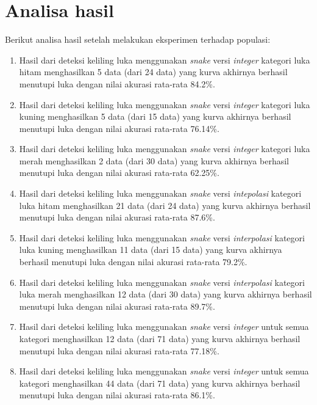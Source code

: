 \section{Analisa hasil}
Berikut analisa hasil setelah melakukan eksperimen terhadap populasi:
\begin{enumerate}
	\item Hasil dari deteksi keliling luka menggunakan \emph{snake} versi \emph{integer} kategori luka hitam menghasilkan 5 data (dari 24 data) yang kurva akhirnya berhasil menutupi luka dengan nilai akurasi rata-rata 84.2\%.
	\item Hasil dari deteksi keliling luka menggunakan \emph{snake} versi \emph{integer} kategori luka kuning menghasilkan 5 data (dari 15 data) yang kurva akhirnya berhasil menutupi luka dengan nilai akurasi rata-rata 76.14\%.
	\item Hasil dari deteksi keliling luka menggunakan \emph{snake} versi \emph{integer} kategori luka merah menghasilkan 2 data (dari 30 data) yang kurva akhirnya berhasil menutupi luka dengan nilai akurasi rata-rata 62.25\%.
	\item Hasil dari deteksi keliling luka menggunakan \emph{snake} versi \emph{intepolasi} kategori luka hitam menghasilkan 21 data (dari 24 data) yang kurva akhirnya berhasil menutupi luka dengan nilai akurasi rata-rata 87.6\%.
	\item Hasil dari deteksi keliling luka menggunakan \emph{snake} versi \emph{interpolasi} kategori luka kuning menghasilkan 11 data (dari 15 data) yang kurva akhirnya berhasil menutupi luka dengan nilai akurasi rata-rata 79.2\%.
	\item Hasil dari deteksi keliling luka menggunakan \emph{snake} versi \emph{interpolasi} kategori luka merah menghasilkan 12 data (dari 30 data) yang kurva akhirnya berhasil menutupi luka dengan nilai akurasi rata-rata 89.7\%.
	\item Hasil dari deteksi keliling luka menggunakan \emph{snake} versi \emph{integer} untuk semua kategori menghasilkan 12 data (dari 71 data) yang kurva akhirnya berhasil menutupi luka dengan nilai akurasi rata-rata 77.18\%.
	\item Hasil dari deteksi keliling luka menggunakan \emph{snake} versi \emph{integer} untuk semua kategori menghasilkan 44 data (dari 71 data) yang kurva akhirnya berhasil menutupi luka dengan nilai akurasi rata-rata 86.1\%.
\end{enumerate}

